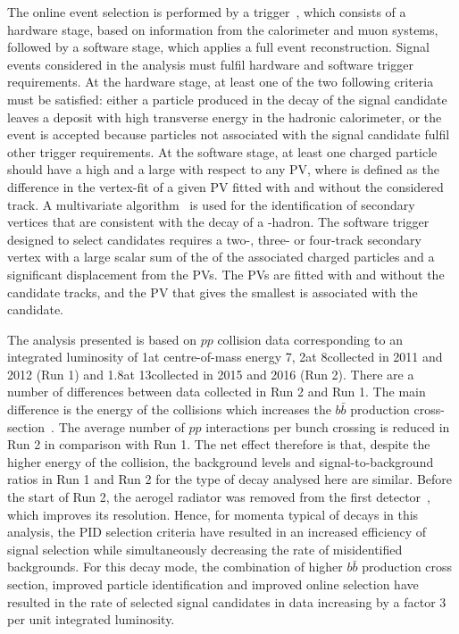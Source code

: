 The online event selection is performed by a trigger~\cite{LHCb-DP-2012-004}, which consists of a hardware stage, based on information from the calorimeter and muon systems, followed by a software stage, which applies a full event reconstruction. Signal events considered in the analysis must fulfil hardware and software trigger requirements. At the hardware stage, at least one of the two following criteria must be satisfied: either a particle produced in the decay of the signal \Bm candidate leaves a deposit with high transverse energy in the hadronic calorimeter, or the event is accepted because particles not associated with the signal candidate fulfil other trigger requirements.
At the software stage, at least one charged particle should have a high \pt and a large \chisqip with respect to any PV, where \chisqip is defined as the difference in the vertex-fit \chisq of a given PV fitted with and without the considered track. A multivariate algorithm~\cite{BBDT} is used for the identification of secondary vertices that are consistent with the decay of a \bquark-hadron.
The software trigger designed to select \decay{\Bm}{\D\Kstarm} candidates requires a two-, three- or four-track secondary vertex with a large scalar sum of the \pt of the associated charged particles and a significant displacement from the PVs.
The PVs are fitted with and without the \B candidate tracks, and the PV that gives the smallest \chisqip is associated with the \B candidate.

The analysis presented is based on $pp$ collision data corresponding to an integrated luminosity of 1\invfb at centre-of-mass energy 7\tev, 2\invfb at 8\tev collected in 2011 and 2012 (Run 1) and 1.8\invfb at 13\tev collected in 2015 and 2016 (Run 2). There are a number of differences between data collected in Run 2 and Run 1. The main difference is the energy of the collisions which increases the $b\bar{b}$ production cross-section~\cite{LHCb-PAPER-2015-037}. The average number of $pp$ interactions per bunch crossing is reduced in Run 2 in comparison with Run 1. The net effect therefore is that, despite the higher energy of the collision, the background levels and signal-to-background ratios in Run 1 and Run 2 for the type of decay analysed here are similar. Before the start of Run 2, the aerogel radiator was removed from the first \rich detector~\cite{LHCb-DP-2012-003}, which improves its resolution. Hence, for momenta typical of decays in this analysis, the PID selection criteria have resulted in an increased efficiency of signal selection while simultaneously decreasing the rate of misidentified backgrounds. For this decay mode, the combination of higher $b\bar{b}$ production cross section, improved particle identification and improved online selection have resulted in the rate of selected signal candidates in data increasing by a factor 3 per unit integrated luminosity.
